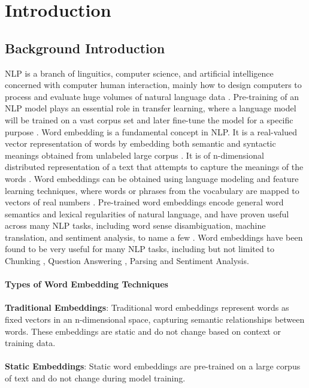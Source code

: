      \chapter{Introduction}
        \section{Background Introduction}
        NLP is a branch of linguitics, computer science, and artificial intelligence concerned with computer human interaction, mainly how to design computers to process and evaluate huge volumes of natural language data \cite{asudani2023impact}. Pre-training of an NLP model plays an essential role in transfer learning, where a language model will be trained on a vast corpus set and later fine-tune the model for a specific purpose \cite{NepaliBERT}. Word embedding is a fundamental concept in NLP. It is a real-valued vector representation of words by embedding both semantic and syntactic meanings obtained from unlabeled large corpus \cite{Wang_Wang_Chen_Wang_Kuo_2019}. It is of n-dimensional distributed representation of a text that attempts to capture the meanings of the words \cite{asudani2023impact}. Word embeddings can be obtained using language modeling and feature learning techniques, where words or phrases from the vocabulary are mapped to vectors of real numbers \cite{enwiki:1219561882}. Pre-trained word embeddings encode general word semantics and lexical regularities of natural language, and have proven useful across many NLP tasks, including word sense disambiguation, machine translation, and sentiment analysis, to name a few \cite{moreo2019wordclass}. Word embeddings have been found to be very useful for many NLP tasks, including but not limited to Chunking \cite{turian-etal-2010-word}, Question Answering \cite{questionanswer}, Parsing and Sentiment Analysis\cite{sentimentanalysis}. \cite{wordembedding} \\\\
        \textbf{Types of Word Embedding Techniques} \cite{reviewOnWordEmbedding} \\\\
        \textbf{Traditional Embeddings}: Traditional word embeddings represent words as fixed vectors in an n-dimensional space, capturing semantic relationships between words.
        These embeddings are static and do not change based on context or training data. \\\\
        \textbf{Static Embeddings}:
        Static word embeddings are pre-trained on a large corpus of text and do not change during model training.
